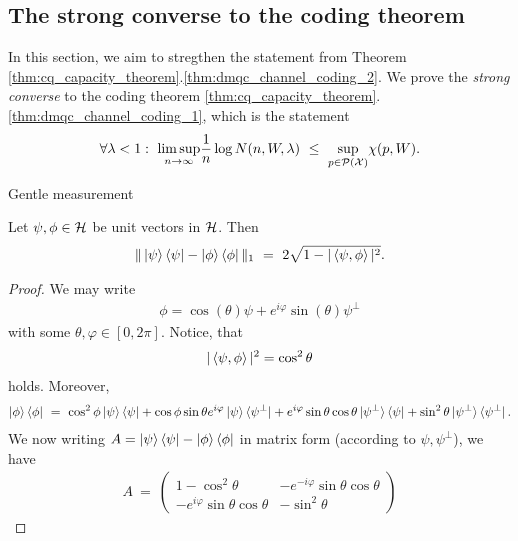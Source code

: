      \subsection{The strong converse to the coding theorem}
     In this section, we aim to stregthen the statement from Theorem \ref{thm:cq_capacity_theorem}.\ref{thm:dmqc_channel_coding_2}. We prove the \emph{strong converse} to the coding theorem \ref{thm:cq_capacity_theorem}.\ref{thm:dmqc_channel_coding_1}, which is the statement
     \begin{align}
      \forall \lambda < 1: \ \underset{n \rightarrow \infty}{\limsup} \frac{1}{n} \log N(n, W, \lambda) \ \leq \ \underset{p \in {\mathcal P}({\mathcal X})}{\sup} \chi(p,W).
     \end{align}
     \begin{subsubsection}{Gentle measurement}
     \begin{lemma}
      Let $\psi, \phi \in {\mathcal H}$ be unit vectors in ${\mathcal H}$. Then 
      \begin{align}
       \|\ket{\psi}\bra{\psi} - \ket{\phi}\bra{\phi}\|_1 \ = \ 2 \sqrt{1 - |\braket{\psi,\phi}|^2}.
      \end{align}
     \end{lemma}
     \begin{proof}
     We may write 
     \begin{align}
      \phi = \cos(\theta) \psi + e^{i\varphi} \sin(\theta) \psi^\perp
     \end{align}
     with some $\theta, \varphi \in [0, 2\pi]$. Notice, that
     \begin{align}
      |\braket{\psi,\phi}|^2 = \cos^2 \theta
     \end{align}
     holds. Moreover,
     \begin{align}
      \ket{\phi} \bra{\phi} \ = \ \cos^2 \phi \ket{\psi}\bra{\psi} + \cos \phi \sin \theta e^{i \varphi} \ket{\psi}\bra{\psi^\perp} + e^{i \varphi} \sin \theta \cos \theta \ket{\psi^\perp}\bra{\psi} 
      + \sin^2 \theta \ket{\psi^\perp}\bra{\psi^\perp}.
     \end{align}
      We now writing $A = \ket{\psi}\bra{\psi} - \ket{\phi} \bra{\phi}$ in matrix form (according to $\psi, \psi^\perp$), we have
      \begin{align*}
       A \ = \ \left(\begin{array}{cc} 1 - \cos^2\theta & - e^{-i\varphi} \sin\theta\cos\theta \\
        - e^{i \varphi} \sin \theta \cos \theta & - \sin^2 \theta \end{array}\right)

\end{align*}
\end{proof}
\end{subsubsection}
